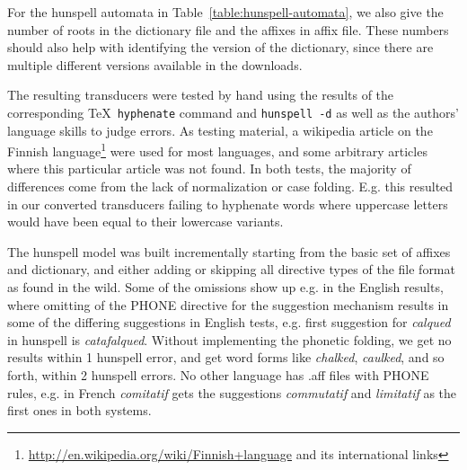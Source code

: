 \documentclass[a4paper,conference]{IEEEtran}
\begin{document}
For the hunspell automata in Table~\ref{table:hunspell-automata}, we also give the
number of roots in the dictionary file and the affixes in affix file. These numbers
should also help with identifying the version of the dictionary, since there are multiple
different versions available in the downloads.

The resulting transducers were tested by hand using the results of the
corresponding \TeX\ \texttt{hyphenate} command and \texttt{hunspell -d} as well
as the authors' language skills to judge errors. As testing material, a wikipedia
article on the Finnish
language\footnote{\url{http://en.wikipedia.org/wiki/Finnish+language} and its
international links} were used for most languages, and some arbitrary articles
where this particular article was not found. In both tests, the majority of differences come from
the lack of normalization or case folding. E.g. this resulted in our converted
transducers failing to hyphenate words where uppercase letters would have been equal to
their lowercase variants. 

The hunspell model was built incrementally
starting from the basic set of affixes and dictionary, and either adding or
skipping all directive types of the file format as found in the wild. Some of
the omissions show up e.g. in the English results, where omitting of the PHONE
directive for the suggestion mechanism results in some of the differing suggestions
in English tests, e.g.  first suggestion for  \emph{calqued} in
hunspell is \emph{catafalqued}. Without implementing the phonetic folding,
we get no results within 1 hunspell error, and get word forms like \emph{chalked},
\emph{caulked}, and so forth, within 2 hunspell errors. No other language has .aff
files with PHONE rules, e.g. in French \emph{comitatif} gets the suggestions \emph{commutatif} and
\emph{limitatif} as the first ones in both systems. 
\end{document}
